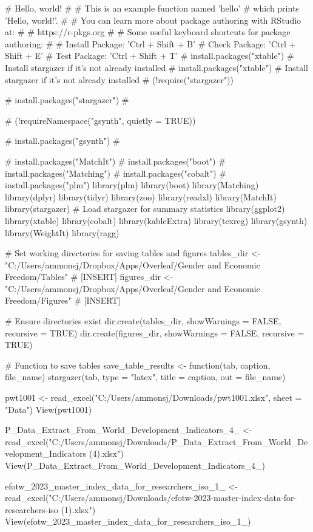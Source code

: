 # Hello, world!
#
# This is an example function named 'hello'
# which prints 'Hello, world!'.
#
# You can learn more about package authoring with RStudio at:
#
#   https://r-pkgs.org
#
# Some useful keyboard shortcuts for package authoring:
#
#   Install Package:           'Ctrl + Shift + B'
#   Check Package:             'Ctrl + Shift + E'
#   Test Package:              'Ctrl + Shift + T'
# install.packages("xtable")
# Install stargazer if it's not already installed
# install.packages("xtable")
# Install stargazer if it's not already installed
#  (!require("stargazer")) {
# install.packages("stargazer")
#

#  (!requireNamespace("gsynth", quietly = TRUE)) {
# install.packages("gsynth")
#


# install.packages("MatchIt")
# install.packages("boot")
# install.packages("Matching")
# install.packages("cobalt")
# install.packages("plm")
library(plm)
library(boot)
library(Matching)
library(dplyr)
library(tidyr)
library(zoo)
library(readxl)
library(MatchIt)
library(stargazer)  # Load stargazer for summary statistics
library(ggplot2)
library(xtable)
library(cobalt)
library(kableExtra)
library(texreg)
library(gsynth)
library(WeightIt)
library(ragg)




# Set working directories for saving tables and figures
tables_dir <- "C:/Users/ammonsj/Dropbox/Apps/Overleaf/Gender and Economic Freedom/Tables"  # [INSERT]
figures_dir <- "C:/Users/ammonsj/Dropbox/Apps/Overleaf/Gender and Economic Freedom/Figures"  # [INSERT]

# Ensure directories exist
dir.create(tables_dir, showWarnings = FALSE, recursive = TRUE)
dir.create(figures_dir, showWarnings = FALSE, recursive = TRUE)

# Function to save tables
save_table_results <- function(tab, caption, file_name) {
  stargazer(tab,
            type = "latex",
            title = caption,
            out = file_name)
}


pwt1001 <- read_excel("C:/Users/ammonsj/Downloads/pwt1001.xlsx",
                      sheet = "Data")
View(pwt1001)

P_Data_Extract_From_World_Development_Indicators_4_ <- read_excel("C:/Users/ammonsj/Downloads/P_Data_Extract_From_World_Development_Indicators (4).xlsx")
View(P_Data_Extract_From_World_Development_Indicators_4_)

efotw_2023_master_index_data_for_researchers_iso_1_ <- read_excel("C:/Users/ammonsj/Downloads/efotw-2023-master-index-data-for-researchers-iso (1).xlsx")
View(efotw_2023_master_index_data_for_researchers_iso_1_)


}}
